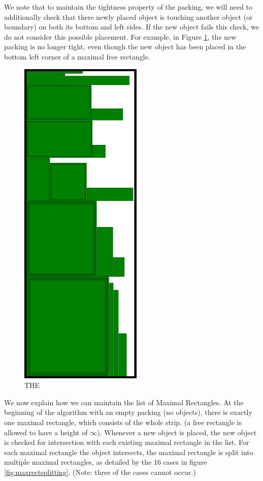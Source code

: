 \documentclass{article}
\begin{document}
\begin{defn}
\begin{defn}
We note that to maintain the tightness property of the packing, we will need to additionally check that there newly placed object is touching another object (or boundary) on both its bottom and left sides. If the new object fails this check, we do not consider this possible placement. For example, in Figure \ref{fig:floatingmaxrect}, the new packing is no longer tight, even though the new object has been placed in the bottom left corner of a maximal free rectangle.

\begin{figure}[!h]
  \centering
  \includegraphics[width=.5\linewidth]{FFDHrun.png}
  \caption{THE}
  \label{fig:floatingmaxrect}
\end{figure}

We now explain how we can maintain the list of Maximal Rectangles. At the beginning of the algorithm with an empty packing (no objects), there is exactly one maximal rectangle, which consists of the whole strip. (a free rectangle is allowed to have a height of $\infty$). Whenever a new object is placed, the new object is checked for intersection with each existing maximal rectangle in the list. For each maximal rectangle the object intersects, the maximal rectangle is split into multiple maximal rectangles, as detailed by the 16 cases in figure \ref{fig:maxrectsplitting}. (Note: three of the cases cannot occur.)


\end{defn}
\end{defn}
\end{document}
